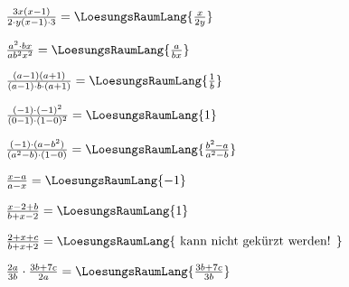 \begin{bbwAufgabenBlock}
\item $\frac{3x(x-1)}{2\cdot{}y(x-1)\cdot{}3} = \LoesungsRaumLang{\frac{x}{2y}}$

\item $\frac{a^2\cdot{}bx}{ab^2x^2} = \LoesungsRaumLang{\frac{a}{bx}}$

\item $\frac{(a-1)(a+1)}{(a-1)\cdot{}b\cdot{}(a+1)} = \LoesungsRaumLang{\frac{1}{b}}$

\item $\frac{(-1)\cdot{}(-1)^2}{(0-1)\cdot{}(1-0)^2} = \LoesungsRaumLang{1}$

\item $\frac{(-1)\cdot{}(a-b^2)}{(a^2-b)\cdot{}(1-0)} = \LoesungsRaumLang{\frac{b^2-a}{a^2-b}}$

\item $\frac{x-a}{a-x} = \LoesungsRaumLang{-1}$

\item $\frac{x-2+b}{b+x-2} = \LoesungsRaumLang{1}$

\item $\frac{2+x+c}{b+x+2} = \LoesungsRaumLang{\textrm{ kann nicht
gekürzt werden! }}$

\item $\frac{2a}{3b} \cdot \frac{3b+7c}{2a} = \LoesungsRaumLang{\frac{3b+7c}{3b}}$

\end{bbwAufgabenBlock}

\platzFuerBerechnungenBisEndeSeite{}


